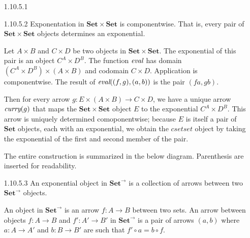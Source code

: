 \documentclass{article}
\newcommand{\curry}[1]{\emph{curry}(#1)}
\newcommand{\eval}{\emph{eval}}
\newcommand{\cset}{\mathbf{Set}}
\newcommand{\cseta}{\mathbf{Set}^{\rightarrow}}
\newcommand{\csetset}{\cset \times \cset}
\begin{document}
\begin{enumerate}
\item [1.10.5.1]
\item [1.10.5.2]
  Exponentation in $\csetset$ is componentwise.
  That is, every pair of $\csetset$ objects determines an exponential.
  
  Let $A \times B$ and $C \times D$ be two objects in $\csetset$.
  The exponential of this pair is an object $C^A \times D^B$.
  The function $\eval$  has domain $(C^A \times D^B) \times (A \times B)$ and codomain $C \times D$.
  Application is componentwise.
  The result of $\eval((f, g), (a,b))$ is the pair $(f a, g b)$.

  Then for every arrow $g : E \times (A \times B) \rightarrow C \times D$, we have a unique arrow $\curry{g}$ that maps the $\csetset$ object $E$ to the exponential $C^A \times D^B$.
  This arrow is uniquely determined comoponentwise; because $E$ is itself a pair of $\cset$ objects, each with an exponential, we obtain the $csetset$ object by taking the exponential of the first and second member of the pair.
  
  The entire construction is summarized in the below diagram.
  Parenthesis are inserted for readability.
  \begin{center}
  \end{center}

\newpage
\item [1.10.5.3]
  An exponential object in $\cseta$ is a collection of arrows between two $\cseta$ objects.

  An object in $\cseta$ is an arrow $f: A \rightarrow B$ between two sets.
  An arrow between objects $f : A \rightarrow B$ and $f' : A' \rightarrow B'$ in $\cseta$ is a pair of arrows $(a,b)$ where $a : A \rightarrow A'$ and $b: B \rightarrow B'$ are such that $f' \circ a = b \circ f$.
  \begin{center}
\end{center}
\end{enumerate}
\end{document}
